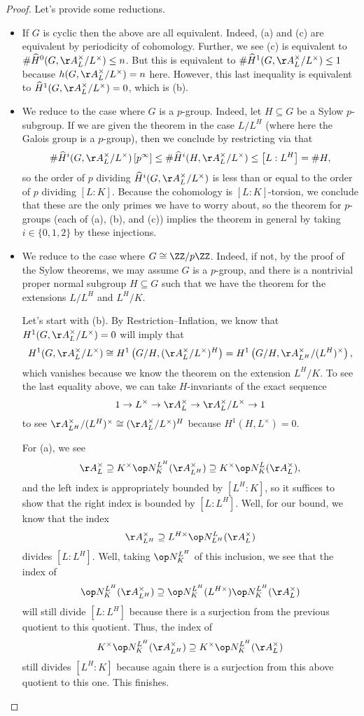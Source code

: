 \documentclass[../notes.tex]{subfiles}
\begin{document}
\begin{proof}
	Let's provide some reductions.
	\begin{itemize}
		\item If $G$ is cyclic then the above are all equivalent. Indeed, (a) and (c) are equivalent by periodicity of cohomology. Further, we see (c) is equivalent to $\#\widehat H^0(G,\AA_L^\times/L^\times)\le n$. But this is equivalent to $\#\widehat H^1(G,\AA_L^\times/L^\times)\le1$ because $h(G,\AA_L^\times/L^\times)=n$ here. However, this last inequality is equivalent to $\widehat H^1(G,\AA_L^\times/L^\times)=0$, which is (b).
		\item We reduce to the case where $G$ is a $p$-group. Indeed, let $H\subseteq G$ be a Sylow $p$-subgroup. If we are given the theorem in the case $L/L^H$ (where here the Galois group is a $p$-group), then we conclude by restricting via  that
		\[\#\widehat H^i(G,\AA_L^\times/L^\times)\left[p^\infty\right]\le\#\widehat H^i(H,\AA_L^\times/L^\times)\le\left[L:L^H\right]=\#H,\]
		so the order of $p$ dividing $\widehat H^i(G,\AA_L^\times/L^\times)$ is less than or equal to the order of $p$ dividing $[L:K]$. Because the cohomology is $[L:K]$-torsion, we conclude that these are the only primes we have to worry about, so the theorem for $p$-groups (each of (a), (b), and (c)) implies the theorem in general by taking $i\in\{0,1,2\}$ by these injections.
		\item We reduce to the case where $G\cong\ZZ/p\ZZ$. Indeed, if not, by the proof of the Sylow theorems, we may assume $G$ is a $p$-group, and there is a nontrivial proper normal subgroup $H\subseteq G$ such that we have the theorem for the extensions $L/L^H$ and $L^H/K$.

		Let's start with (b). By Restriction--Inflation, we know that $H^1(G,\AA_L^\times/L^\times)=0$ will imply that
		\[H^1(G,\AA_L^\times/L^\times)\cong H^1\left(G/H,(\AA_L^\times/L^\times)^H\right)=H^1\left(G/H,\AA_{L^H}^\times/(L^H)^\times\right),\]
		which vanishes because we know the theorem on the extension $L^H/K$. To see the last equality above, we can take $H$-invariants of the exact sequence
		\[1\to L^\times\to\AA_L^\times\to\AA_L^\times/L^\times\to1\]
		to see $\AA_{L^H}^\times/(L^H)^\times\cong(\AA_L^\times/L^\times)^H$ because $H^1(H,L^\times)=0$.

		For (a), we see
		\[\AA_L^\times\supseteq K^\times\op N_K^{L^H}(\AA_{L^H}^\times)\supseteq K^\times\op N^L_K(\AA_L^\times),\]
		and the left index is appropriately bounded by $[L^H:K]$, so it suffices to show that the right index is bounded by $[L:L^H]$. Well, for our bound, we know that the index
		\[\AA_{L^H}^\times\supseteq L^{H\times}\op N^L_{L^H}(\AA_L^\times)\]
		divides $[L:L^H]$. Well, taking $\op N^{L^H}_K$ of this inclusion, we see that the index of
		\[\op N^{L^H}_K(\AA_{L^H}^\times)\supseteq\op N^{L^H}_K(L^{H\times})\op N^{L^H}_K(\AA_L^\times)\]
		will still divide $[L:L^H]$ because there is a surjection from the previous quotient to this quotient. Thus, the index of
		\[K^\times\op N^{L^H}_K(\AA_{L^H}^\times)\supseteq K^\times\op N^{L^H}_K(\AA_L^\times)\]
		still divides $[L^H:K]$ because again there is a surjection from this above quotient to this one. This finishes.
		

\end{itemize}
\end{proof}
\end{document}

